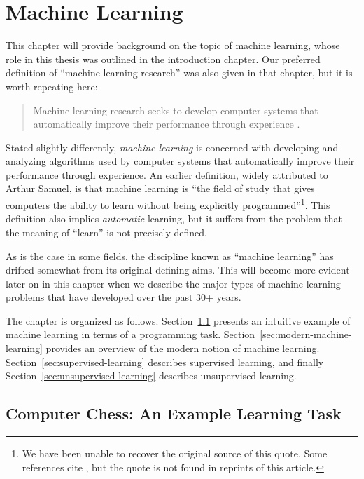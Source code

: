 \chapter{Machine Learning}
\label{ch:machine_learning}
%
This chapter will provide background on the topic of machine learning, whose role in this thesis was outlined in the introduction chapter. Our preferred definition of ``machine learning research'' was also given in that chapter, but it is worth repeating here:
%
\begin{quote}
Machine learning research seeks to develop computer systems that automatically improve their performance through experience \cite{Mitchell1990}.
\end{quote}
%	
Stated slightly differently, \emph{machine learning} is concerned with developing and analyzing algorithms used by computer systems that automatically improve their performance through experience. An earlier definition, widely attributed to Arthur Samuel, is that machine learning is ``the field of study that gives computers the ability to learn without being
explicitly programmed''\footnote{We have been unable to recover the original source of this quote. Some references cite \cite{samuel1959some}, but the quote is not found in reprints of this article.}. This definition also implies \emph{automatic} learning, but it suffers from the problem that the meaning of ``learn'' is not precisely defined.

As is the case in some fields, the discipline known as ``machine learning'' has drifted somewhat from its original defining aims. This will become more evident later on in this chapter when we describe the major types of machine learning problems that have developed over the past 30+ years.

The chapter is organized as follows. Section~\ref{sec:chess} presents an intuitive example of machine learning in terms of a programming task. Section~\ref{sec:modern-machine-learning} provides an overview of the modern notion of machine learning. Section~\ref{sec:supervised-learning} describes supervised learning, and finally Section~\ref{sec:unsupervised-learning} describes unsupervised learning. 


\section{Computer Chess: An Example Learning Task}
\label{sec:chess}


